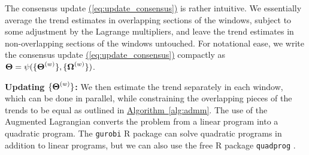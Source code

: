 \documentclass[aoas]{imsart}
\newcommand{\Eqn}[1]{\hyperref[eq:#1]{{\rm (\ref*{eq:#1})}}} %
\newcommand{\Alg}[1]{\hyperref[alg:#1]{Algorithm~\ref*{alg:#1}}} %
\newcommand{\Eqn}[1]{{(\ref{eq:#1})}} %
\newcommand{\Alg}[1]{{Algorithm~\ref{alg:#1}}} %
\newcommand{\M}[1]{{\bm{\mathbf{\MakeUppercase{#1}}}}} %
\newcommand{\Mn}[2]{\M{#1}^{(#2)}} %
\begin{document}
The consensus update \Eqn{update_consensus} is rather intuitive. We essentially average the trend estimates in overlapping sections of the windows, subject to some adjustment by the Lagrange multipliers, and leave the trend estimates in non-overlapping sections of the windows untouched.
For notational ease, we write the consensus update \Eqn{update_consensus} compactly as $\M{\Theta} = \psi(\{\Mn{\Theta}{w}\},\{\Mn{\Omega}{w}\})$.

{\bf Updating $\{\Mn{\Theta}{w}\}$: } We then estimate the trend separately in each window, which can be done in parallel, while constraining the overlapping pieces of the trends to be equal as outlined in \Alg{admm}. The use of the Augmented Lagrangian converts the problem from a linear program into a quadratic program. The \texttt{gurobi} R package \citep{gurobi} can solve quadratic programs in addition to linear programs, but we can also use the free R package \texttt{quadprog} \citep{quadprog}.
\end{document}
